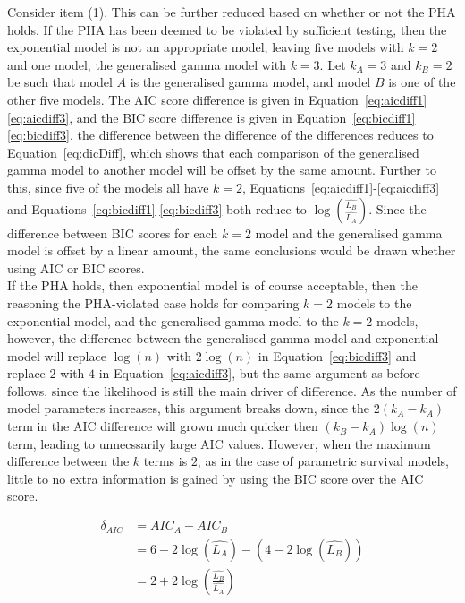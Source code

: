 Consider item (1). This can be further reduced based on whether or not the PHA holds. If the PHA has been deemed to be violated by sufficient testing, then the exponential model is not an appropriate model, leaving five models with $k = 2$ and one model, the generalised gamma model with $k = 3$. Let $k_A = 3$ and $k_B = 2$ be such that model $A$ is the generalised gamma model, and model $B$ is one of the other five models. The AIC score difference is given in Equation~\ref{eq:aicdiff1}\-\ref{eq:aicdiff3}, and the BIC score difference is given in Equation~\ref{eq:bicdiff1}\-\ref{eq:bicdiff3}, the difference between the difference of the differences reduces to  Equation~\ref{eq:dicDiff}, which shows that each comparison of the generalised gamma model to another model will be offset by the same amount. Further to this, since five of the models all have $k = 2$, Equations~\ref{eq:aicdiff1}-\ref{eq:aicdiff3} and Equations~\ref{eq:bicdiff1}-\ref{eq:bicdiff3} both reduce to $\log\left(\frac{\hat{L_B}}{\hat{L_A}}\right)$. Since the difference between BIC scores for each $k = 2$ model and the generalised gamma model is offset by a linear amount, the same conclusions would be drawn whether using AIC or BIC scores. \\

If the PHA holds, then exponential model is of course acceptable, then the reasoning the PHA-violated case holds for comparing $k = 2$ models to the exponential model, and the generalised gamma model to the $k = 2$ models, however, the difference between the generalised gamma model and exponential model will replace $\log(n)$ with $2\log(n)$ in Equation~\ref{eq:bicdiff3} and replace $2$ with $4$ in Equation~\ref{eq:aicdiff3}, but the same argument as before follows, since the likelihood is still the main driver of difference. As the number of model parameters increases, this argument breaks down, since the $2(k_A - k_A)$ term in the AIC difference will grown much quicker then $(k_B-k_A)\log(n)$ term, leading to unnecssarily large AIC values. However, when the maximum difference between the $k$ terms is $2$, as in the case of parametric survival models, little to no extra information is gained by using the BIC score over the AIC score. 

\begin{align}
    \delta_{AIC} &= AIC_A - AIC_B \label{eq:aicdiff1}\\
           &= 6 - 2\log(\hat{L_A}) - (4 - 2\log(\hat{L_B})) \\
           &= 2 + 2\log\left(\frac{\hat{L_B}}{\hat{L_A}}\right) \label{eq:aicdiff3}
\end{align}

